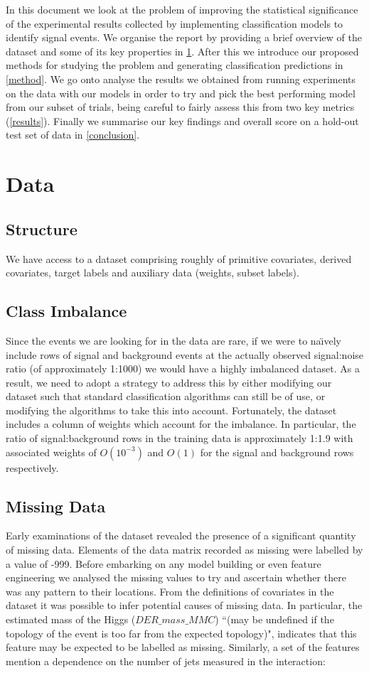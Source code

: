 In this document we look at the problem of improving the statistical significance of the experimental results collected by implementing classification models to identify signal events. We organise the report by providing a brief overview of the dataset and some of its key properties in \ref{data}. After this we introduce our proposed methods for studying the problem and generating classification predictions in \ref{method}. We go onto analyse the results we obtained from running experiments on the data with our models in order to try and pick the best performing model from our subset of trials, being careful to fairly assess this from two key metrics (\ref{results}). Finally we summarise our key findings and overall score on a hold-out test set of data in \ref{conclusion}.

\section{Data}
\label{data}
\subsection{Structure}
We have access to a dataset comprising roughly of primitive covariates, derived covariates, target labels and auxiliary data (weights, subset labels). 

\subsection{Class Imbalance}
Since the events we are looking for in the data are rare, if we were to na\"{\i}vely include rows of signal and background events at the actually observed signal:noise ratio (of approximately 1:1000) we would have a highly imbalanced dataset. As a result, we need to adopt a strategy to address this by either modifying our dataset such that standard classification algorithms can still be of use, or modifying the algorithms to take this into account. Fortunately, the dataset includes a column of weights which account for the imbalance. In particular, the ratio of signal:background rows in the training data is approximately 1:1.9 with associated weights of $O(10^{-3})$ and $O(1)$ for the signal and background rows respectively.

\subsection{Missing Data}
Early examinations of the dataset revealed the presence of a significant quantity of missing data. Elements of the data matrix recorded as missing were labelled by a value of -999. Before embarking on any model building or even feature engineering we analysed the missing values to try and ascertain whether there was any pattern to their locations. From the definitions of covariates in the dataset it was possible to infer potential causes of missing data. In particular, the estimated mass of the Higgs ($DER\_mass\_MMC$) ``(may be undefined if the topology of the event is too far from the expected topology)", indicates that this feature may be expected to be labelled as missing. Similarly, a set of the features mention a dependence on the number of jets measured in the interaction:

